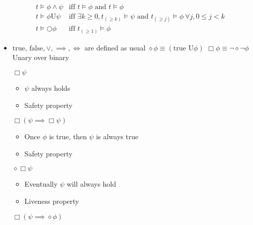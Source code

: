 \begin{itemize}
\begin{itemize}
\begin{itemize}
\begin{align*}
    &t \models \phi \wedge \psi &\text{iff } t \models \phi \text{ and } t \models \phi\\
    &t \models \phi \text{U} \psi &\text{iff } \exists k \ge 0, t_{(\ge k)} \models \psi \text{ and } t_{(\ge j)} \models \phi \ \forall j, 0 \le j < k\\
    &t \models \bigcirc \phi &\text{iff } t_{(\ge 1)} \models \phi
\end{align*}
                \end{itemize}
                \begin{itemize}
                    \item $\text{true, false}, \vee, \implies, \iff$ are defined as usual
                     $\diamond \phi \equiv (\text{true U} \phi)$
                     $\Box \phi \equiv \neg \diamond \neg \phi$
                     Unary over binary
                        \begin{itemize}
                             $\Box \psi$
                                \begin{itemize}
                                    \item $\psi$ always holds
                                    \item Safety property
                                \end{itemize}
                             $\Box (\psi \implies \Box \psi)$
                                \begin{itemize}
                                    \item Once $\phi$ is true, then $\psi$ is always true
                                    \item Safety property
                                \end{itemize}
                             $\diamond \Box \psi$
                                \begin{itemize}
                                    \item Eventually $\psi$ will always hold
                                    \item Liveness property
                                \end{itemize}
                             $\Box (\psi \implies \diamond \phi)$

\end{itemize}
\end{itemize}
\end{itemize}
\end{itemize}
